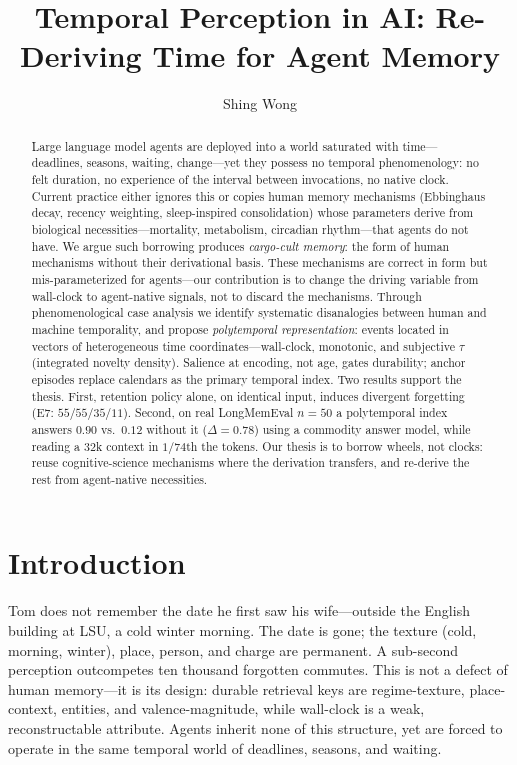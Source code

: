 \documentclass[letterpaper]{article}
\title{Temporal Perception in AI: Re-Deriving Time for Agent Memory}
\author{Shing Wong}
\begin{document}
\maketitle
\begin{abstract}
Large language model agents are deployed into a world saturated with time---deadlines, seasons, waiting, change---yet they possess no temporal phenomenology: no felt duration, no experience of the interval between invocations, no native clock. Current practice either ignores this or copies human memory mechanisms (Ebbinghaus decay, recency weighting, sleep-inspired consolidation) whose parameters derive from biological necessities---mortality, metabolism, circadian rhythm---that agents do not have. We argue such borrowing produces \emph{cargo-cult memory}: the form of human mechanisms without their derivational basis. These mechanisms are correct in form but mis-parameterized for agents---our contribution is to change the driving variable from wall-clock to agent-native signals, not to discard the mechanisms. Through phenomenological case analysis we identify systematic disanalogies between human and machine temporality, and propose \emph{polytemporal representation}: events located in vectors of heterogeneous time coordinates---wall-clock, monotonic, and subjective $\tau$ (integrated novelty density). Salience at encoding, not age, gates durability; anchor episodes replace calendars as the primary temporal index. Two results support the thesis. First, retention policy alone, on identical input, induces divergent forgetting (E7: $55$/$55$/$35$/$11$). Second, on real LongMemEval $n{=}50$ a polytemporal index answers $0.90$ vs.\ $0.12$ without it ($\Delta{=}0.78$) using a commodity answer model, while reading a $32$k context in $1/74$th the tokens. Our thesis is to borrow wheels, not clocks: reuse cognitive-science mechanisms where the derivation transfers, and re-derive the rest from agent-native necessities.
\end{abstract}

\section{Introduction}
Tom does not remember the date he first saw his wife---outside the English building at LSU, a cold winter morning. The date is gone; the texture (cold, morning, winter), place, person, and charge are permanent. A sub-second perception outcompetes ten thousand forgotten commutes. This is not a defect of human memory---it is its design: durable retrieval keys are regime-texture, place-context, entities, and valence-magnitude, while wall-clock is a weak, reconstructable attribute. Agents inherit none of this structure, yet are forced to operate in the same temporal world of deadlines, seasons, and waiting.
\end{document}
